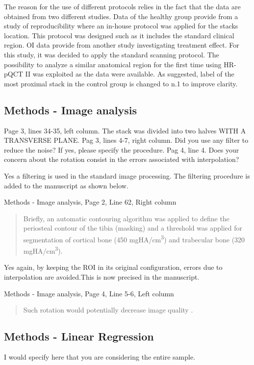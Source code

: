 \documentclass{AR2RC}
\begin{document}
\AR The reason for the use of different protocols relies in the fact that the data are obtained from two different studies. Data of the healthy group provide from a study of reproducibility where an in-house protocol was applied for the stacks location. This protocol was designed such as it includes the standard clinical region. OI data provide from another study investigating treatment effect. For this study, it was decided to apply the standard scanning protocol. The possibility to analyze a similar anatomical region for the first time using HR-pQCT II was exploited as the data were available. As suggested, label of the most proximal stack in the control group is changed to n.1 to improve clarity.

\subsection{Methods - Image analysis}
\RC Page 3, lines 34-35, left column. The stack was divided into two halves WITH A TRANSVERSE PLANE. Pag 3, lines 4-7, right column. Did you use any filter to reduce the noise? If yes, please specify the procedure. Pag 4, line 4. Does your concern about the rotation consist in the errors associated with interpolation?

\AR Yes a filtering is used in the standard image processing. The filtering procedure is added to the manuscript as shown below.\par

Methods - Image analysis, Page 2, Line 62, Right column
\begin{quote}
	Briefly, an automatic contouring algorithm was applied to define the periosteal contour of the tibia (masking) and a threshold was applied for segmentation of cortical bone (450 mgHA/cm\textsuperscript{3}) and trabecular bone (320 mgHA/cm\textsuperscript{3}).
\end{quote}

Yes again, by keeping the ROI in its original configuration, errors due to interpolation are avoided.This is now precised in the manuscript.\par

Methods - Image analysis, Page 4, Line 5-6, Left column
\begin{quote}
	Such rotation would potentially decrease image quality .
\end{quote}

\subsection{Methods - Linear Regression}
\RC I would specify here that you are considering the entire sample.
\end{document}
